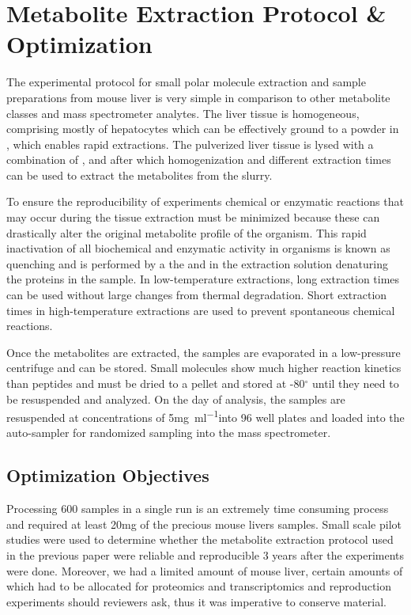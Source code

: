 \documentclass[a4paper,11pt,twoside]{book}
\begin{document}
	\section{Metabolite Extraction Protocol \& Optimization}
	
	The experimental protocol for small polar molecule extraction and sample preparations from mouse liver is very simple in comparison to other metabolite classes and mass spectrometer analytes\citep{Mushtaq2014ExtractionMetabolome,Haynes2009Sphingolipidomics:Sphingolipids,Hu2009AnalyticalDiscovery}. The liver tissue is homogeneous, comprising mostly of hepatocytes which can be effectively ground to a powder in , which enables rapid extractions. The pulverized liver tissue is lysed with a combination of ,  and  after which homogenization and different extraction times can be used to extract the metabolites from the slurry. 
	
    To ensure the reproducibility of experiments chemical or enzymatic reactions that may occur during the tissue extraction must be minimized because these can drastically alter the original metabolite profile of the organism\citep{Mushtaq2014ExtractionMetabolome}. This rapid inactivation of all biochemical and enzymatic activity in organisms is known as quenching and is performed by a the  and  in the extraction solution denaturing the proteins in the sample. In low-temperature extractions, long extraction times can be used without large changes from thermal degradation. Short extraction times in high-temperature extractions are used to prevent spontaneous chemical reactions. 
	
    Once the metabolites are extracted, the samples are evaporated in a low-pressure centrifuge and can be stored. Small molecules show much higher reaction kinetics than peptides and must be dried to a pellet and stored at -80$^{\circ}$ until they need to be resuspended and analyzed. On the day of analysis, the samples are resuspended at concentrations of 5\si{\milli\gram\per\milli\litre}into 96 well plates and loaded into the auto-sampler for randomized sampling into the mass spectrometer.
	
	\subsection{Optimization Objectives}
	
	Processing 600 samples in a single run is an extremely time consuming process and required at least 20\si{\milli\gram} of the precious mouse livers samples. Small scale pilot studies were used to determine whether the metabolite extraction protocol used in the previous paper\citep{Williams2016SystemsFunction} were reliable and reproducible 3 years after the experiments were done. Moreover, we had a limited amount of mouse liver, certain amounts of which had to be allocated for proteomics and transcriptomics and reproduction experiments should reviewers ask, thus it was imperative to conserve material. 
	
\end{document}
